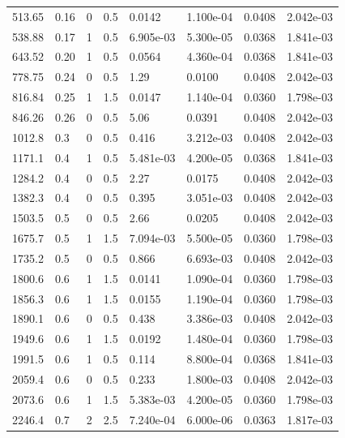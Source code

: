 \documentclass[preview]{standalone}
\begin{document}
{{\begin{tabular}{L{1.2cm}C{1.2cm} C{0.3cm}C{0.5cm} C{1.4cm}C{1.4cm} C{1.4cm}C{1.4cm}}
  513.65  &  0.16  & 0     & 0.5 &  0.0142  & 1.100e-04  & 0.0408 &  2.042e-03   \\ 
  538.88  &  0.17  & 1     & 0.5 &  6.905e-03  & 5.300e-05  & 0.0368 &  1.841e-03   \\ 
  643.52  &  0.20  & 1     & 0.5 &  0.0564  & 4.360e-04  & 0.0368 &  1.841e-03   \\ 
  778.75  &  0.24  & 0     & 0.5 &  1.29  & 0.0100  & 0.0408 &  2.042e-03   \\ 
  816.84  &  0.25  & 1     & 1.5 &  0.0147  & 1.140e-04  & 0.0360 &  1.798e-03   \\ 
  846.26  &  0.26  & 0     & 0.5 &  5.06  & 0.0391  & 0.0408 &  2.042e-03   \\ 
  1012.8  &   0.3  & 0     & 0.5 &  0.416  & 3.212e-03  & 0.0408 &  2.042e-03   \\ 
  1171.1  &   0.4  & 1     & 0.5 &  5.481e-03  & 4.200e-05  & 0.0368 &  1.841e-03   \\ 
  1284.2  &   0.4  & 0     & 0.5 &  2.27  & 0.0175  & 0.0408 &  2.042e-03   \\ 
  1382.3  &   0.4  & 0     & 0.5 &  0.395  & 3.051e-03  & 0.0408 &  2.042e-03   \\ 
  1503.5  &   0.5  & 0     & 0.5 &  2.66  & 0.0205  & 0.0408 &  2.042e-03   \\ 
  1675.7  &   0.5  & 1     & 1.5 &  7.094e-03  & 5.500e-05  & 0.0360 &  1.798e-03   \\ 
  1735.2  &   0.5  & 0     & 0.5 &  0.866  & 6.693e-03  & 0.0408 &  2.042e-03   \\ 
  1800.6  &   0.6  & 1     & 1.5 &  0.0141  & 1.090e-04  & 0.0360 &  1.798e-03   \\ 
  1856.3  &   0.6  & 1     & 1.5 &  0.0155  & 1.190e-04  & 0.0360 &  1.798e-03   \\ 
  1890.1  &   0.6  & 0     & 0.5 &  0.438  & 3.386e-03  & 0.0408 &  2.042e-03   \\ 
  1949.6  &   0.6  & 1     & 1.5 &  0.0192  & 1.480e-04  & 0.0360 &  1.798e-03   \\ 
  1991.5  &   0.6  & 1     & 0.5 &  0.114  & 8.800e-04  & 0.0368 &  1.841e-03   \\ 
  2059.4  &   0.6  & 0     & 0.5 &  0.233  & 1.800e-03  & 0.0408 &  2.042e-03   \\ 
  2073.6  &   0.6  & 1     & 1.5 &  5.383e-03  & 4.200e-05  & 0.0360 &  1.798e-03   \\ 
  2246.4  &   0.7  & 2     & 2.5 &  7.240e-04  & 6.000e-06  & 0.0363 &  1.817e-03   \\ 

\end{tabular}}}
\end{document}
